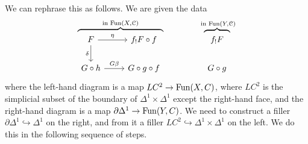 \documentclass[main.tex]{subfiles}
\begin{document}
We can rephrase this as follows. We are given the data
\begin{equation*}
  \overbrace{
  \begin{tikzcd}[ampersand replacement=\&]
    F
    \arrow[r, "\eta"]
    \arrow[d, swap, "\delta"]
    \& f_{!}F \circ f
    \\
    G \circ h
    \arrow[r, "G \beta"]
    \& G \circ g \circ f
  \end{tikzcd}}^{\text{in }\Fun(X, \category{C})}
  \qquad\qquad
  \overbrace{
  \begin{tikzcd}
    f_{!}F
    \\
    G \circ g
  \end{tikzcd}}^{\text{ in }\Fun(Y, \category{C})}
\end{equation*}
where the left-hand diagram is a map $LC^{2} \to \mathrm{Fun}(X, C)$, where $LC^{2}$ is the simplicial subset of the boundary of $\Delta^{1} \times \Delta^{1}$ except the right-hand face, and the right-hand diagram is a map $\partial \Delta^{1} \to \mathrm{Fun}(Y, C)$. We need to construct a filler $\partial \Delta^{1} \hookrightarrow \Delta^{1}$ on the right, and from it a filler $LC^{2} \hookrightarrow \Delta^{1} \times \Delta^{1}$ on the left. We do this in the following sequence of steps.
\end{document}
